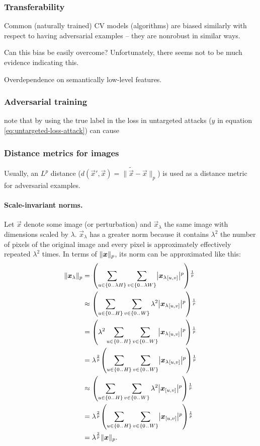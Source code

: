 \documentclass{article}
\begin{document}
\subsubsection{Transferability}

Common (naturally trained) CV models (algorithms) are biased similarly with respect to having adversarial examples -- they are nonrobust in similar ways. 

Can this bias be easily overcome? Unfortunately, there seems not to be much evidence indicating this.

Overdependence on semantically low-level features.

\subsubsection{Adversarial training}

\cite{Kurakin:2016:AMLS} note that by using the true label in the loss in untargeted attacks ($y$ in equation \eqref{eq:untargeted-loss-attack}) can cause

\subsubsection{Distance metrics for images}

Usually, an $L^p$ distance ($d(\vec x', \vec x)=\lVert\tilde{\vec x}-\vec x\rVert_p$) is used as a distance metric for adversarial examples.

\paragraph{Scale-invariant norms.}
Let $\vec x$ denote some image (or perturbation) and $\vec x_\lambda$ the same image with dimensions scaled by $\lambda$. $\vec x_\lambda$ has a greater norm because it contains $\lambda^2$ the number of pixels of the original image and every pixel is approximately effectively repeated $\lambda^2$ times. In terms of $\enVert{\vec x}_p$, its norm can be approximated like this:
\begin{align}
    \enVert{\vec x_\lambda}_p 
    &= \del{\sum_{u\in\cbr{0\bidot\lambda H}}\sum_{v\in\cbr{0\bidot\lambda W}} \envert{{\vec x_\lambda}_\ind{u, v}}^p}^{\frac{1}{p}} \\
    &\approx \del{\sum_{u\in\cbr{0\bidot H}}\sum_{v\in\cbr{0\bidot W}} \lambda^2 \envert{{\vec x_\lambda}_\ind{u, v}}^p}^{\frac{1}{p}} \\
    &= \del{\lambda^2\sum_{u\in\cbr{0\bidot H}}\sum_{v\in\cbr{0\bidot W}} \envert{{\vec x_\lambda}_\ind{u, v}}^p}^{\frac{1}{p}} \\
    &= \lambda^\frac{2}{p} \del{\sum_{u\in\cbr{0\bidot H}}\sum_{v\in\cbr{0\bidot W}} \envert{{\vec x_\lambda}_\ind{u, v}}^p}^{\frac{1}{p}} \\
    &\approx \del{\sum_{u\in\cbr{0\bidot H}}\sum_{v\in\cbr{0\bidot W}} \lambda^2 \envert{{\vec x}_\ind{u, v}}^p}^{\frac{1}{p}} \\
    &= \lambda^\frac{2}{p} \del{\sum_{u\in\cbr{0\bidot H}}\sum_{v\in\cbr{0\bidot W}} \envert{{\vec x}_\ind{u, v}}^p}^{\frac{1}{p}} \\
    &= \lambda^\frac{2}{p} \enVert{\vec x}_p \text{.}
\end{align}
\end{document}
